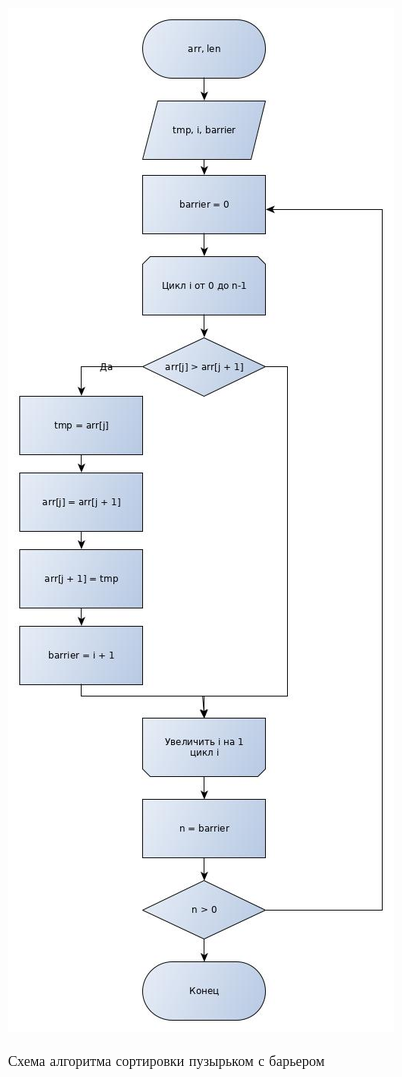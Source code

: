 \documentclass[a4paper, 14pt]{article}
\begin{document}
        \newpage
        	\begin{figure}[h]
        	\begin{center}
        		{\includegraphics[scale=0.41]{barrier}}
        		\caption{Схема алгоритма сортировки пузырьком с барьером}
        	\end{center}
        \end{figure}
\end{document}

